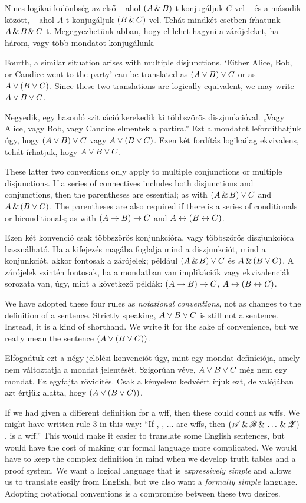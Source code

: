 Nincs logikai különbség az első -- ahol $(A \,\&\, B)$-t konjugáljuk $C$-vel -- és a második között, -- ahol $A$-t konjugáljuk $(B \,\&\, C)$-vel. Tehát mindkét esetben írhatunk $A \,\&\, B \,\&\, C$-t. Megegyezhetünk abban, hogy el lehet hagyni a zárójeleket, ha három, vagy több mondatot konjugálunk.

Fourth, a similar situation arises with multiple disjunctions. `Either Alice, Bob, or Candice went to the party' can be translated as $(A \vee B) \vee C$ or as $A \vee (B \vee C)$. Since these two translations are logically equivalent, we may write $A \vee B \vee C$.

Negyedik, egy hasonló szituáció kerekedik ki többszörös diszjunkcióval. „Vagy Alice, vagy Bob, vagy Candice elmentek a partira.” Ezt a mondatot lefordíthatjuk úgy, hogy $(A \vee B) \vee C$ vagy $A \vee (B \vee C)$. Ezen két fordítás logikailag ekvivalens, tehát írhatjuk, hogy $A \vee B \vee C$.

These latter two conventions only apply to multiple conjunctions or multiple  disjunctions. If a series of connectives includes both disjunctions and conjunctions, then the parentheses are essential; as with $(A \,\&\, B) \vee C$ and $A \,\&\, (B \vee C)$. The parentheses are also required if there is a series of conditionals or biconditionals; as with $(A \rightarrow B) \rightarrow C$ and $A \leftrightarrow (B \leftrightarrow C)$.

Ezen két konvenció csak többszörös konjunkcióra, vagy többszörös diszjunkcióra használható. Ha a kifejezés magába foglalja mind a diszjunkciót, mind a konjunkciót, akkor fontosak a zárójelek; például $(A \,\&\, B) \vee C$ és $A \,\&\, (B \vee C)$. A zárójelek szintén fontosak, ha a mondatban van implikációk vagy ekvivalenciák sorozata van, úgy, mint a következő példák: 	$(A \rightarrow B) \rightarrow C$, $A \leftrightarrow (B \leftrightarrow C)$.

We have adopted these four rules as \emph{notational conventions}, not as changes to the definition of a sentence. Strictly speaking, $A \vee B \vee C$ is still not a sentence. Instead, it is a kind of shorthand. We write it for the sake of convenience, but we really mean the sentence $(A \vee (B \vee C))$.

Elfogadtuk ezt a négy jelölési konvenciót úgy, mint egy mondat definíciója, amely nem változtatja a mondat jelentését. Szigorúan véve, $A \vee B \vee C$ még nem egy mondat. Ez egyfajta rövidítés. Csak a kényelem kedvéért írjuk ezt, de valójában azt értjük alatta, hogy $(A \vee (B \vee C))$.

If we had given a different definition for a wff, then these could count as wffs. We might have written rule 3 in this way: ``If , , $\ldots$  are wffs, then $(\mathscr{A}\,\&\,\mathscr{B}\,\&\,\ldots\,\&\,\mathscr{Z})$, is a wff.'' This would make it easier to translate some English sentences, but would have the cost of making our formal language more complicated. We would have to keep the complex definition in mind when we develop truth tables and a proof system. We want a logical language that is \emph{expressively simple} and allows us to translate easily from English, but we also want a \emph{formally simple} language. Adopting notational conventions is a compromise between these two desires.

